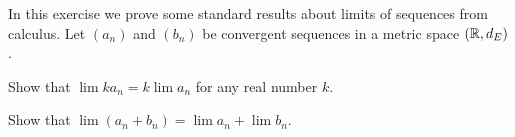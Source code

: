 \begin{comment}

\ExerciseSolution 
\ba
\item Let $(Y,d')$ be a subspace of $(X,d)$. Let $a_1$, $a_2$, $\ldots$ be a sequence of points in $Y$ and assume $\lim_n a_n = a$ for some $a \in Y$. Let $\epsilon > 0$. Then there exists an $N \in \Z^+$ so that $d'(a_n,a) < \epsilon$ whenever $n \geq N$. But $d'(a_n,a) = d(a_n,a)$, so $d(a_n,a) < \epsilon$ whenever $n \geq N$. This implies that $\lim a_n = a$ in $X$. 

\item Here we assume $d = d_E$ in $\R$ and that $d_{\Q}$ is the restriction of $d$ to $\Q$. Let $\epsilon > 0$. Since $\lim a_n = \sqrt{2}$, there exists $N \in \Z^+$ so that $n \geq N$ implies $| a_n - \sqrt{2} | < \frac{\epsilon}{2}$. Now let $n, m > N$. The triangle inequality then gives us \[| a_n - a_m | \leq | a_n - \sqrt(2)| + | \sqrt{2} - a_m | < \frac{\epsilon}{2} + \frac{\epsilon}{2} = \epsilon.\]

Now we will show that the sequence $(a_n)$ does not converge as a sequence in $\Q$. Assume to the contrary that the sequence $(a_n)$ does converge as a sequence in $\Q$. The uniqueness of limits then implies that $\sqrt{2}$ is a rational number. That means that $\sqrt{2} = \frac{p}{q}$ for some relatively prime positive integers $p$ and $q$. This implies that $q\sqrt{2} = p$ or $2q^2 = p^2$. The fact that $2$ divides $p^2$ means that $p$ must be even. So $p = 2r$ for some positive integer $r$. It follows that 
\[2q^2 = (2r)^2 = 4r^2.\]
But then $q^2 = 2r^2$ and $2$ divides $q$. This contradicts the fact that $p$ and $q$ are relatively prime. So $\sqrt{2}$ is not a rational number and the sequence $(a_n)$ does not converge as a sequence in $\Q$.  

\ea

\end{comment}

\item \label{ex:limit_properties} In this exercise we prove some standard results about limits of sequences from calculus. Let $(a_n)$ and $(b_n)$ be convergent sequences in a metric space $(\mathbb{R},d_E)$. 

\ba

\item Show that $\lim ka_n = k \lim a_n$ for any real number $k$.

\item Show that $\lim (a_n + b_n) = \lim a_n + \lim b_n$. 

